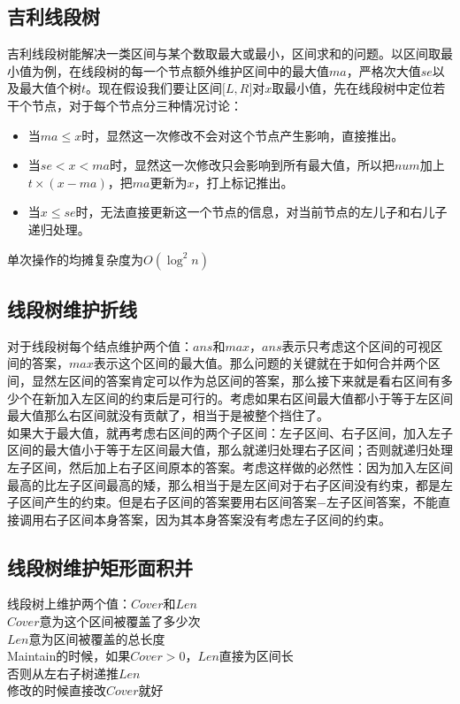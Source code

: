     \subsection*{吉利线段树}
        吉利线段树能解决一类区间与某个数取最大或最小，区间求和的问题。以区间取最小值为例，在线段树的每一个节点额外维护区间中的最大值$ ma $，严格次大值$ se $以及最大值个树$ t $。现在假设我们要让区间$ \lbrack L, R \rbrack $对$ x $取最小值，先在线段树中定位若干个节点，对于每个节点分三种情况讨论：
        \begin{itemize}[wide=0pt]
            \item 当$ ma \leq x $时，显然这一次修改不会对这个节点产生影响，直接推出。
            \item 当$ se < x < ma $时，显然这一次修改只会影响到所有最大值，所以把$ num $加上$ t \times (x - ma) $，把$ ma $更新为$ x $，打上标记推出。
            \item 当$ x \leq se $时，无法直接更新这一个节点的信息，对当前节点的左儿子和右儿子递归处理。
        \end{itemize}
        单次操作的均摊复杂度为$ O(\log^2 n) $
    \subsection*{线段树维护折线}
        对于线段树每个结点维护两个值：$ ans $和$ max $，$ ans $表示只考虑这个区间的可视区间的答案，$ max $表示这个区间的最大值。那么问题的关键就在于如何合并两个区间，显然左区间的答案肯定可以作为总区间的答案，那么接下来就是看右区间有多少个在新加入左区间的约束后是可行的。考虑如果右区间最大值都小于等于左区间最大值那么右区间就没有贡献了，相当于是被整个挡住了。
        \\如果大于最大值，就再考虑右区间的两个子区间：左子区间、右子区间，加入左子区间的最大值小于等于左区间最大值，那么就递归处理右子区间；否则就递归处理左子区间，然后加上右子区间原本的答案。考虑这样做的必然性：因为加入左区间最高的比左子区间最高的矮，那么相当于是左区间对于右子区间没有约束，都是左子区间产生的约束。但是右子区间的答案要用右区间答案$ - $左子区间答案，不能直接调用右子区间本身答案，因为其本身答案没有考虑左子区间的约束。
    \subsection*{线段树维护矩形面积并}
        \noindent 线段树上维护两个值：$ Cover $和$ Len $
        \\$ Cover $意为这个区间被覆盖了多少次
        \\$ Len $意为区间被覆盖的总长度
        \\Maintain的时候，如果$ Cover > 0 $，$ Len $直接为区间长
        \\否则从左右子树递推$ Len $
        \\修改的时候直接改$ Cover $就好
